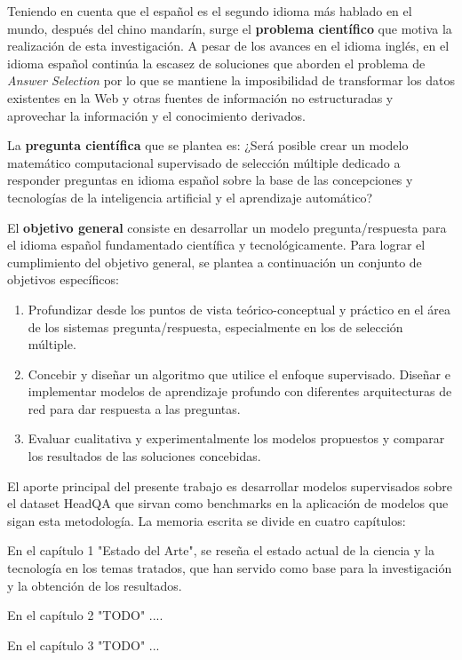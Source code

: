 Teniendo en cuenta que el español es el segundo idioma más hablado en el mundo, después del chino mandarín, surge el \textbf{problema científico} que motiva la realización de esta investigación. A pesar de los avances en el idioma inglés, en el idioma español continúa la escasez de soluciones que aborden el problema de \textit{Answer Selection} por lo que se mantiene la imposibilidad de transformar los datos existentes en la Web y otras fuentes de información no estructuradas y aprovechar la información y el conocimiento derivados.

La \textbf{pregunta científica} que se plantea es: ¿Será posible crear un modelo matemático computacional supervisado de selección múltiple dedicado a responder preguntas en idioma español sobre la base de las concepciones y tecnologías de la inteligencia artificial y el aprendizaje automático?

El \textbf{objetivo general} consiste en desarrollar un modelo pregunta/respuesta para el idioma español fundamentado científica y tecnológicamente. Para lograr el cumplimiento del objetivo general, se plantea a continuación un conjunto de objetivos específicos:

\begin{enumerate}
    \item Profundizar desde los puntos de vista teórico-conceptual y práctico en el área de los sistemas pregunta/respuesta, especialmente en los de selección múltiple. 
    \item Concebir y diseñar un algoritmo que utilice el enfoque supervisado. Diseñar e implementar modelos de aprendizaje profundo con diferentes arquitecturas de red para dar respuesta a las preguntas.
    \item Evaluar cualitativa y experimentalmente los modelos propuestos y comparar los resultados de las soluciones concebidas.
\end{enumerate}


El aporte principal del presente trabajo es desarrollar modelos supervisados sobre el dataset HeadQA que sirvan como benchmarks en la aplicación de modelos que sigan esta metodología. La memoria escrita se divide en cuatro capítulos:

En el capítulo 1 "Estado del Arte", se reseña el estado actual de la ciencia y la tecnología en los temas tratados, que han servido como base para la investigación y la obtención de los resultados.

En el capítulo 2 "TODO" ....


En el capítulo 3 "TODO" ...


